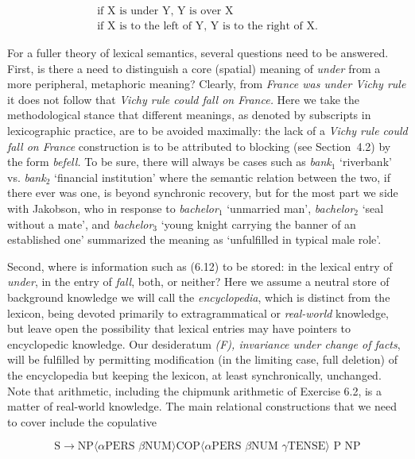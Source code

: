\begin{eqnarray}
\mbox{if X is under Y, Y is over X}\\
\mbox{if X is to the left of Y, Y is to the right of X.}
\end{eqnarray}

\noindent
For a fuller theory of lexical semantics, several questions need to be
answered. First, is there a need to distinguish a core (spatial) meaning of
{\it under} from a more peripheral, metaphoric meaning? Clearly, from {\it
  France was under Vichy rule} it does not follow that {\it *Vichy rule could
  fall on France.} Here we take the methodological stance that different
meanings, as denoted by subscripts in lexicographic practice, are to be
avoided maximally: the lack of a {\it *Vichy rule could fall on France}
construction is to be attributed to blocking (see Section~4.2) by the form
{\it befell.} To be sure, there will always be cases such as {\it bank$_1$}
`riverbank' vs. {\it bank$_2$} `financial institution' where the semantic
relation between the two, if there ever was one, is beyond synchronic
recovery, but for the most part we side with Jakobson, who in response to {\it
  bachelor$_1$} `unmarried man', {\it bachelor$_2$} `seal without a mate', and
{\it bachelor$_3$} `young knight carrying the banner of an established one'
summarized the meaning as `unfulfilled in typical male role'.

Second, where is information such as (6.12) to be stored: in the lexical entry
of {\it under}, in the entry of {\it fall}, both, or neither? Here we assume a
neutral store of background knowledge we will call the {\it encyclopedia},
which is distinct from the lexicon, being devoted primarily to
extragrammatical or {\it real-world} knowledge, but leave open the possibility
that lexical entries may have pointers to encyclopedic knowledge. Our
desideratum {\sl (F), invariance under change of facts}, will be fulfilled by
permitting modification (in the limiting case, full deletion) of the
encyclopedia but keeping the lexicon, at least synchronically, unchanged.
Note that arithmetic, including the chipmunk arithmetic of Exercise 6.2, is a
matter of real-world knowledge. The main relational constructions that we need
to cover include the copulative

\begin{equation}
\text{S} \rightarrow \text{NP$\langle$}\alpha\text{PERS } \beta\text{NUM$\rangle$
  COP$\langle$}\alpha\text{PERS } \beta\text{NUM }
\gamma\text{TENSE$\rangle$ P NP}
\end{equation}

